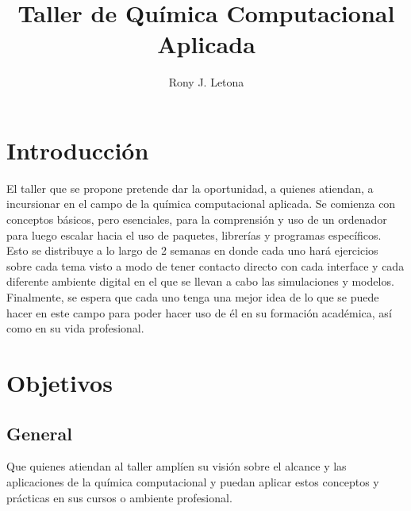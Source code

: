\documentclass[10pt,letterpaper]{article}
\author{Rony J. Letona}
\title{Taller de Qu\'imica Computacional Aplicada}
\begin{document}
\maketitle

\section{Introducci\'on}
El taller que se propone pretende dar la oportunidad, a quienes atiendan, a incursionar en el campo de la qu\'imica computacional aplicada. Se comienza con conceptos b\'asicos, pero esenciales, para la comprensi\'on y uso de un ordenador para luego escalar hacia el uso de paquetes, librer\'ias y programas espec\'ificos. Esto se distribuye a lo largo de 2 semanas en donde cada uno har\'a ejercicios sobre cada tema visto a modo de tener contacto directo con cada interface y cada diferente ambiente digital en el que se llevan a cabo las simulaciones y modelos. Finalmente, se espera que cada uno tenga una mejor idea de lo que se puede hacer en este campo para poder hacer uso de \'el en su formaci\'on acad\'emica, as\'i como en su vida profesional.

\section{Objetivos}
\subsection{General}
Que quienes atiendan al taller ampl\'ien su visi\'on sobre el alcance y las aplicaciones de la qu\'imica computacional y puedan aplicar estos conceptos y pr\'acticas en sus cursos o ambiente profesional.
\end{document}
